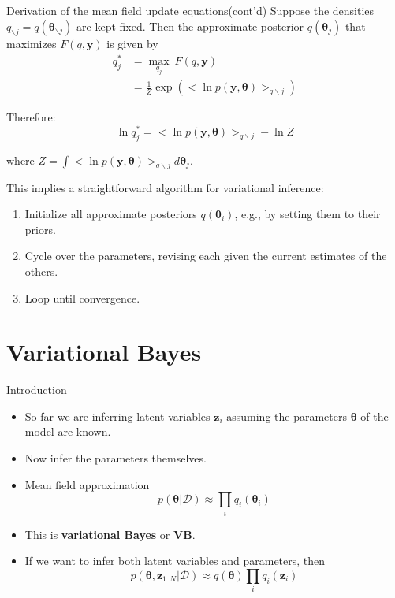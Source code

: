 \documentclass[10pt,mathserif]{beamer}
\begin{document}
\begin{frame}{Derivation of the mean field update equations(cont'd)}
Suppose the densities $q_{\backslash j} = q(\bm{\theta}_{\backslash j})$ are kept fixed. Then the approximate posterior $q(\bm{\theta}_j)$ that maximizes $F(q,\bm{y})$ is given by
\begin{equation}
    \begin{split}
        q_j^* 
        & = \max_{q_j}\ F(q,\bm{y})\\
        & = \frac{1}{Z}\exp(<\ln p(\bm{y},\bm{\theta})>_{q\backslash j}) 
    \end{split}
\end{equation}

Therefore:
\begin{equation}
    \ln q_j^* = <\ln p(\bm{y},\bm{\theta})>_{q\backslash j} - \ln Z
\end{equation}

where $Z = \int <\ln p(\bm{y},\bm{\theta})>_{q\backslash j} d \bm{\theta}_j$. \bigskip
    
This implies a straightforward algorithm for variational inference: 
\begin{enumerate}
    \item Initialize all approximate posteriors $q(\bm{\theta}_i)$, e.g., by setting them to their priors.
    \item Cycle over the parameters, revising each given the current estimates of the others.
    \item Loop until convergence.
\end{enumerate}
\end{frame}

\section{Variational Bayes}
\begin{frame}{Introduction}
\begin{itemize}
    \item So far we are inferring latent variables $\bm{z}_i$ assuming the parameters $\bm{\theta}$ of the model are known.
    \item Now infer the parameters themselves.
    \item Mean field approximation
    \begin{equation}
        p(\bm{\theta}|\mathcal{D}) \approx \prod_i q_i(\bm{\theta}_i)
    \end{equation}
    \item This is \textbf{variational Bayes}  or \textbf{VB}.
    \item If we want to infer both latent variables and parameters, then 
    \begin{equation}
        p(\bm{\theta}, \bm{z}_{1:N}|\mathcal{D}) \approx q (\bm{\theta})\prod_i q_i(\bm{z}_i)
    \end{equation}
\end{itemize}
\end{frame}
\end{document}
